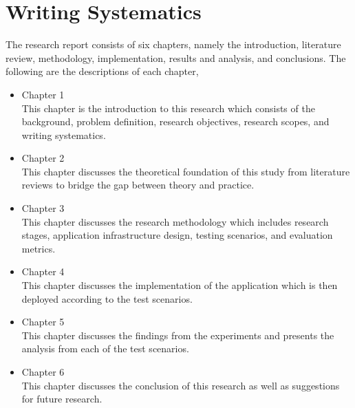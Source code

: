\section{Writing Systematics}
\label{sec:sistematikaPenulisan}
The research report consists of six chapters, namely the introduction, literature review, methodology, implementation, results and analysis, and conclusions. The following are the descriptions of each chapter,
\begin{itemize}
	\item Chapter 1 \babSatu \\
	    This chapter is the introduction to this research which consists of the background, problem definition, research objectives, research scopes, and writing systematics.
	\item Chapter 2 \babDua \\
            This chapter discusses the theoretical foundation of this study from literature reviews to bridge the gap between theory and practice.
	\item Chapter 3 \babTiga \\
	    This chapter discusses the research methodology which includes research stages, application infrastructure design, testing scenarios, and evaluation metrics.
	\item Chapter 4 \babEmpat \\
		This chapter discusses the implementation of the application which is then deployed according to the test scenarios.
	\item Chapter 5 \babLima \\
	    This chapter discusses the findings from the experiments and presents the analysis from each of the test scenarios.
	\item Chapter 6 \kesimpulan \\
	    This chapter discusses the conclusion of this research as well as suggestions for future research.    
\end{itemize}


